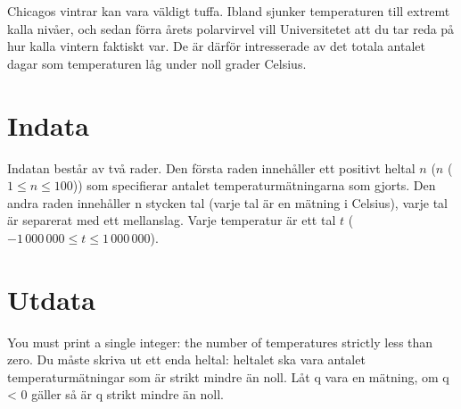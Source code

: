 Chicagos vintrar kan vara väldigt tuffa. Ibland sjunker temperaturen till extremt kalla nivåer, och sedan förra årets polarvirvel vill Universitetet att du tar reda på hur kalla vintern faktiskt var. De är därför intresserade av det totala antalet dagar som temperaturen låg under noll grader Celsius.

\section*{Indata}
Indatan består av två rader. Den första raden innehåller ett positivt heltal $n$ ($n$ ($1 \le n \le 100$)) som specifierar antalet temperaturmätningarna som gjorts. Den andra raden innehåller n stycken tal (varje tal är en mätning i Celsius), varje tal är separerat med ett mellanslag. Varje temperatur är ett tal $t$ ($-1\,000\,000 \le t \le 1\,000\,000$).

\section*{Utdata}
You must print a single integer: the number of temperatures strictly less than zero.
Du måste skriva ut ett enda heltal: heltalet ska vara antalet temperaturmätningar som är strikt mindre än noll.
Låt q vara en mätning, om q < 0 gäller så är q strikt mindre än noll.
